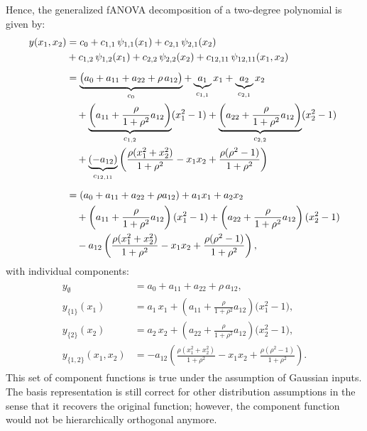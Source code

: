 Hence, the generalized fANOVA decomposition of a two-degree polynomial is given by:
\begin{align*}
y(x_1,x_2) 
&= c_0 
  + c_{1,1}\,\psi_{1,1}(x_1) 
  + c_{2,1}\,\psi_{2,1}(x_2) \\
&+ c_{1,2}\,\psi_{1,2}(x_1)
  + c_{2,2}\,\psi_{2,2}(x_2)
  + c_{12,11}\,\psi_{12,11}(x_1,x_2) \\[5pt]
&= 
\underbrace{\big(a_0 + a_{11} + a_{22} + \rho\,a_{12}\big)}_{c_0} 
+ \underbrace{a_1}_{c_{1,1}} x_1
+ \underbrace{a_2}_{c_{2,1}} x_2 \\ 
&\quad 
+ \underbrace{\left(a_{11} + \frac{\rho}{1+\rho^2}a_{12}\right)}_{c_{1,2}} (x_1^2 - 1)
+ \underbrace{\left(a_{22} + \frac{\rho}{1+\rho^2}a_{12}\right)}_{c_{2,2}} (x_2^2 - 1) \notag \\
&\quad 
+ \underbrace{(-a_{12})}_{c_{12, 11}}\left(
    \frac{\rho(x_1^2+x_2^2)}{1+\rho^2} - x_1 x_2 
    + \frac{\rho(\rho^2-1)}{1+\rho^2}
  \right) \\[5pt]
&= 
(a_0 + a_{11} + a_{22} + \rho a_{12})
+ a_1 x_1
+ a_2 x_2 \notag \\ 
&\quad 
+ \left(a_{11} + \frac{\rho}{1+\rho^2} a_{12}\right)(x_1^2 - 1)
+ \left(a_{22} + \frac{\rho}{1+\rho^2} a_{12}\right)(x_2^2 - 1) \notag \\
&\quad 
- a_{12}\left(
  \frac{\rho(x_1^2 + x_2^2)}{1+\rho^2}
  - x_1 x_2
  + \frac{\rho(\rho^2 - 1)}{1+\rho^2}
  \right),
\end{align*}
with individual components:
\begin{align}
\begin{split}
y_{\emptyset} &= a_0 + a_{11} + a_{22} + \rho\,a_{12}, \\[3pt]
y_{\{1\}}(x_1) &= a_1\,x_1 
  + \left(a_{11} + \frac{\rho}{1+\rho^2}a_{12}\right)\bigl(x_1^2 - 1\bigr), \\[3pt]
y_{\{2\}}(x_2) &= a_2\,x_2 
  + \left(a_{22} + \frac{\rho}{1+\rho^2}a_{12}\right)\bigl(x_2^2 - 1\bigr), \\[3pt]
y_{\{1,2\}}(x_1,x_2) 
&= -a_{12}\!\left(
    \frac{\rho(x_1^2+x_2^2)}{1+\rho^2} 
    - x_1 x_2 
    + \frac{\rho(\rho^2-1)}{1+\rho^2}
   \right).
\end{split}
\label{eq:fanova_components_2D_polynomial}
\end{align}
This set of component functions is true under the assumption of Gaussian inputs. The basis representation is still correct for other distribution assumptions in the sense that it recovers the original function; however, the component function would not be hierarchically orthogonal anymore.\par
